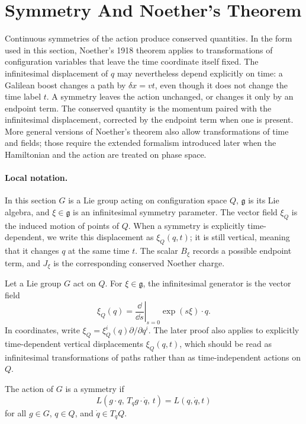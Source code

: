 \section{Symmetry And Noether's Theorem}
\label{sec:noether}

Continuous symmetries of the action produce conserved quantities. In the form
used in this section, Noether's 1918 theorem applies to transformations of
configuration variables that leave the time coordinate itself fixed. The
infinitesimal displacement of \(q\) may nevertheless depend explicitly on time:
a Galilean boost changes a path by \(\delta x=vt\), even though it does not
change the time label \(t\). A symmetry leaves the action unchanged, or changes
it only by an endpoint term. The conserved quantity is the momentum paired with
the infinitesimal displacement, corrected by the endpoint term when one is
present. More general versions of Noether's theorem also allow transformations
of time and fields; those require the extended formalism introduced later when
the Hamiltonian and the action are treated on phase space.

\paragraph{Local notation.}
In this section \(G\) is a Lie group acting on configuration space \(Q\),
\(\mathfrak g\) is its Lie algebra, and \(\xi\in\mathfrak g\) is an
infinitesimal symmetry parameter.  The vector field \(\xi_Q\) is the induced
motion of points of \(Q\).  When a symmetry is explicitly time-dependent, we
write this displacement as \(\xi_Q(q,t)\); it is still vertical, meaning that
it changes \(q\) at the same time \(t\).  The scalar \(B_\xi\) records a
possible endpoint term, and \(J_\xi\) is the corresponding conserved Noether
charge.

\begin{definition}
Let a Lie group \(G\) act on \(Q\). For \(\xi\in\mathfrak g\), the infinitesimal
generator is the vector field
\[
  \xi_Q(q)=\left.\frac{\dd}{\dd s}\right|_{s=0}\exp(s\xi)\cdot q.
\]
In coordinates, write \(\xi_Q=\xi_Q^i(q)\partial/\partial q^i\).
The later proof also applies to explicitly time-dependent vertical
displacements \(\xi_Q(q,t)\), which should be read as infinitesimal
transformations of paths rather than as time-independent actions on \(Q\).
\end{definition}

\begin{definition}
The action of \(G\) is a symmetry if
\[
  L(g\cdot q,\,T_qg\cdot \dot q,\,t)=L(q,\dot q,t)
\]
for all \(g\in G\), \(q\in Q\), and \(\dot q\in T_qQ\).
\end{definition}

